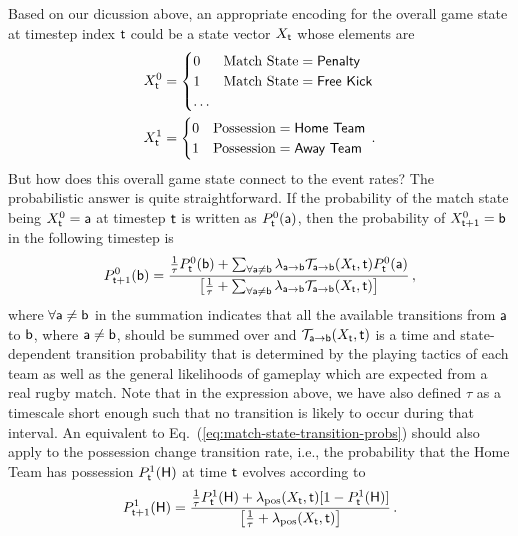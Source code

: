 Based on our dicussion above, an appropriate encoding for the overall game state at timestep index ${\sf t}$ could be a state vector $X_{{\sf t}}$ whose elements are
\begin{align}
X^0_{{\sf t}}&=\begin{cases} 0 & \text{Match State} = \text{{\sf Penalty}}\\ 1 & \text{Match State} = \text{{\sf Free Kick}} \\ \dots & \end{cases} \\
X^1_{{\sf t}}&=\begin{cases} 0 & \text{Possession} = \text{{\sf Home Team}}\\ 1 & \text{Possession} = \text{{\sf Away Team}} \end{cases} \,.
\end{align}
But how does this overall game state connect to the event rates? The probabilistic answer is quite straightforward. If the probability of the match state being $X^0_{{\sf t}}={\sf a}$ at timestep ${\sf t}$ is written as $P^0_{{\sf t}}({\sf a})$, then the probability of $X^0_{{\sf t}+1}={\sf b}$ in the following timestep is
\begin{align}
P^0_{{\sf t}+1}({\sf b}) = \frac{\frac{1}{\tau}P^0_{{\sf t}}({\sf b})+\sum_{\forall {\sf a}\neq {\sf b}}\lambda_{{\sf a}\rightarrow {\sf b}}{\cal T}_{{\sf a}\rightarrow {\sf b}}(X_{\sf t}, {\sf t})P^0_{{\sf t}}({\sf a})}{\big[ \frac{1}{\tau} + \sum_{\forall {\sf a}\neq {\sf b}}\lambda_{{\sf a}\rightarrow {\sf b}} {\cal T}_{{\sf a}\rightarrow {\sf b}}(X_{\sf t}, {\sf t})\big]} \label{eq:match-state-transition-probs}\,,
\end{align}
where $\forall {\sf a} \neq {\sf b}$ in the summation indicates that all the available transitions from ${\sf a}$ to ${\sf b}$, where ${\sf a}\neq {\sf b}$, should be summed over and ${\cal T}_{{\sf a}\rightarrow {\sf b}}(X_{\sf t}, {\sf t})$ is a time and state-dependent transition probability that is determined by the playing tactics of each team as well as the general likelihoods of gameplay which are expected from a real rugby match. Note that in the expression above, we have also defined $\tau$ as a timescale short enough such that no transition is likely to occur during that interval. An equivalent to Eq.~(\ref{eq:match-state-transition-probs}) should also apply to the possession change transition rate, i.e., the probability that the {\sf Home Team} has possession $P^1_{{\sf t}}({\sf H})$ at time ${\sf t}$ evolves according to
\begin{align}
P^1_{{\sf t}+1}({\sf H}) = \frac{ \frac{1}{\tau}P^1_{{\sf t}}({\sf H}) + \lambda_{\rm pos}(X_{\sf t}, {\sf t}) [1-P^1_{{\sf t}}({\sf H})]}{\big[ \frac{1}{\tau} + \lambda_{\rm pos}(X_{\sf t}, {\sf t})\big]} \label{eq:possession-change-probs}\,.
\end{align}

